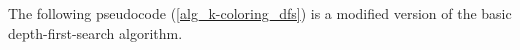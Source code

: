 The following pseudocode (\ref{alg_k-coloring_dfs}) is a modified version of
the basic depth-first-search algorithm.

%
%
%


